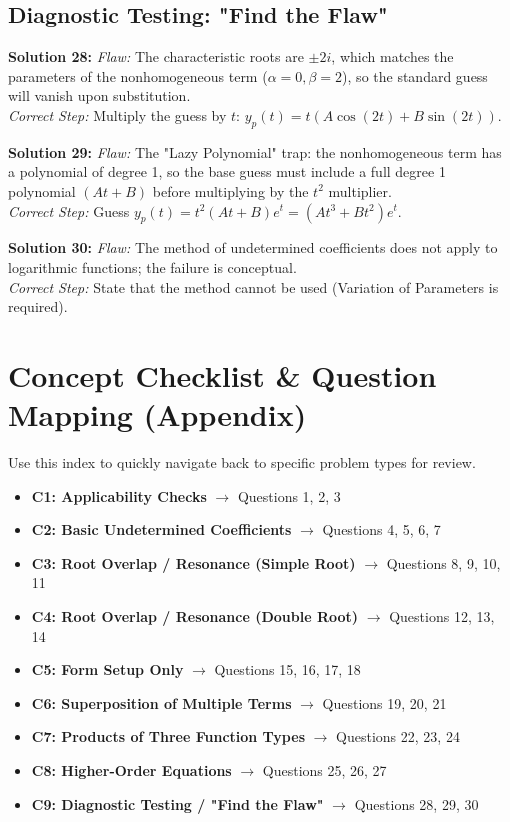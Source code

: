 \documentclass[11pt]{article}
\begin{document}
\subsection*{Diagnostic Testing: "Find the Flaw"}

\textbf{Solution 28:} 
\textit{Flaw:} The characteristic roots are $\pm 2i$, which matches the parameters of the nonhomogeneous term ($\alpha=0, \beta=2$), so the standard guess will vanish upon substitution. \\
\textit{Correct Step:} Multiply the guess by $t$: $y_p(t) = t(A\cos(2t) + B\sin(2t))$.

\textbf{Solution 29:} 
\textit{Flaw:} The "Lazy Polynomial" trap: the nonhomogeneous term has a polynomial of degree 1, so the base guess must include a full degree 1 polynomial $(At+B)$ before multiplying by the $t^2$ multiplier. \\
\textit{Correct Step:} Guess $y_p(t) = t^2(At + B)e^t = (At^3 + Bt^2)e^t$.

\textbf{Solution 30:} 
\textit{Flaw:} The method of undetermined coefficients does not apply to logarithmic functions; the failure is conceptual. \\
\textit{Correct Step:} State that the method cannot be used (Variation of Parameters is required).

\newpage

\section{Concept Checklist \& Question Mapping (Appendix)}
Use this index to quickly navigate back to specific problem types for review.

\begin{itemize}
    \item \textbf{C1: Applicability Checks} $\rightarrow$ Questions 1, 2, 3
    \item \textbf{C2: Basic Undetermined Coefficients} $\rightarrow$ Questions 4, 5, 6, 7
    \item \textbf{C3: Root Overlap / Resonance (Simple Root)} $\rightarrow$ Questions 8, 9, 10, 11
    \item \textbf{C4: Root Overlap / Resonance (Double Root)} $\rightarrow$ Questions 12, 13, 14
    \item \textbf{C5: Form Setup Only} $\rightarrow$ Questions 15, 16, 17, 18
    \item \textbf{C6: Superposition of Multiple Terms} $\rightarrow$ Questions 19, 20, 21
    \item \textbf{C7: Products of Three Function Types} $\rightarrow$ Questions 22, 23, 24
    \item \textbf{C8: Higher-Order Equations} $\rightarrow$ Questions 25, 26, 27
    \item \textbf{C9: Diagnostic Testing / "Find the Flaw"} $\rightarrow$ Questions 28, 29, 30
\end{itemize}
\end{document}
